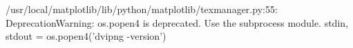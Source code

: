 \newcommand{\kdbarmemfig}{\texttt{[image: kd-bar-mem]}}
/usr/local/matplotlib/lib/python/matplotlib/texmanager.py:55: DeprecationWarning: os.popen4 is deprecated.  Use the subprocess module.
  stdin, stdout = os.popen4('dvipng -version')
\newcommand{\kdbarspeedfig}{\texttt{[image: kd-bar-speed]}}
